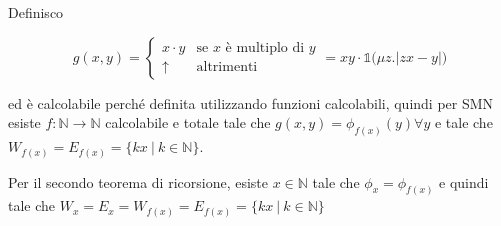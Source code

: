 Definisco

$$
g(x,y) = \begin{cases}
x \cdot y & \text{se }x \text{ è multiplo di }y \\
\uparrow &\text{altrimenti}
\end{cases} = xy \cdot \mathbb{1}\big( \mu z . |zx - y|\big)
$$

ed è calcolabile perché definita utilizzando funzioni calcolabili, quindi per SMN esiste $f : \mathbb{N} \rightarrow \mathbb{N}$ calcolabile e totale tale che $g(x,y) = \phi_{f(x)}(y) \forall y$ e tale che $W_{f(x)}= E_{f(x)} =  \{ k x \: | \: k \in \mathbb{N} \}$.

Per il secondo teorema di ricorsione, esiste $x \in \mathbb{N}$ tale che $\phi_x = \phi_{f(x)}$ e quindi tale che $W_x = E_x = W_{f(x)}= E_{f(x)} =  \{ k x \: | \: k \in \mathbb{N} \}$




